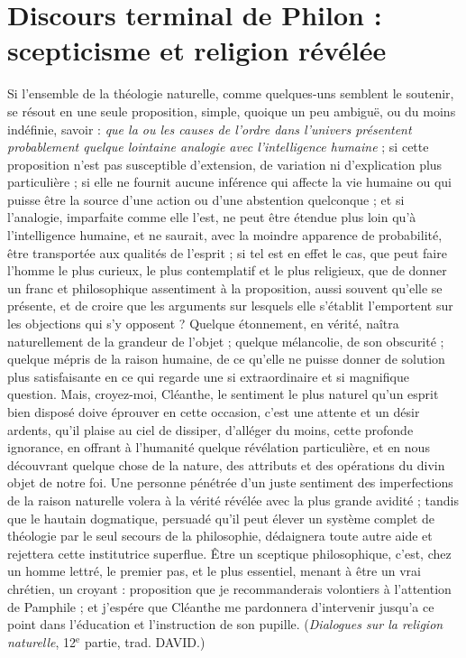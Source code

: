 
\section{Discours terminal de Philon : scepticisme et religion révélée}
%
Si l'ensemble de la théologie naturelle, comme quelques-uns
semblent le soutenir, se résout en une seule proposition,
simple, quoique un peu ambiguë, ou du moins indéfinie,
savoir : {\it que la ou les causes de l'ordre dans l'univers
présentent probablement quelque lointaine analogie avec
l'intelligence humaine} ; si cette proposition n’est pas
susceptible d’extension, de variation ni d’explication
plus particulière ; si elle ne fournit aucune inférence qui
affecte la vie humaine ou qui puisse être la source d’une
action ou d’une abstention quelconque ; et si l’analogie,
imparfaite comme elle l’est, ne peut être étendue plus
loin qu’à l’intelligence humaine, et ne saurait, avec la
moindre apparence de probabilité, être transportée aux
qualités de l’esprit ; si tel est en effet le cas, que peut faire
l’homme le plus curieux, le plus contemplatif et le plus
religieux, que de donner un franc et philosophique assentiment
à la proposition, aussi souvent qu’elle se présente,
et de croire que les arguments sur lesquels elle s’établit
l'emportent sur les objections qui s’y opposent ? Quelque
étonnement, en vérité, naîtra naturellement de la grandeur
de l’objet ; quelque mélancolie, de son obscurité ; quelque
mépris de la raison humaine, de ce qu’elle ne puisse donner
de solution plus satisfaisante en ce qui regarde une si
extraordinaire et si magnifique question. Mais, croyez-moi,
Cléanthe, le sentiment le plus naturel qu’un esprit
bien disposé doive éprouver en cette occasion, c’est une
attente et un désir ardents, qu’il plaise au ciel de dissiper,
d’alléger du moins, cette profonde ignorance, en offrant
à l'humanité quelque révélation particulière, et en nous
découvrant quelque chose de la nature, des attributs et
des opérations du divin objet de notre foi. Une personne
pénétrée d’un juste sentiment des imperfections de la
raison naturelle volera à la vérité révélée avec la plus
grande avidité ; tandis que le hautain dogmatique, persuadé
qu’il peut élever un système complet de théologie
par le seul secours de la philosophie, dédaignera toute
autre aide et rejettera cette institutrice superflue. \^Etre
un sceptique philosophique, c’est, chez un homme lettré,
le premier pas, et le plus essentiel, menant à être un vrai
chrétien, un croyant : proposition que je recommanderais
volontiers à l'attention de Pamphile ; et j’espére que
Cléanthe me pardonnera d’intervenir jusqu’a ce point
dans l’éducation et l’instruction de son pupille. ({\it Dialogues
sur la religion naturelle}, 12$^\text{e}$ partie, trad. D{\footnotesize AVID}.)
